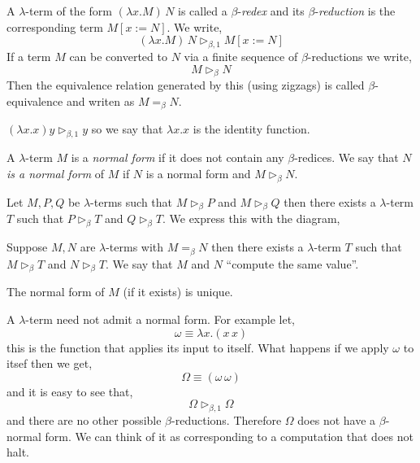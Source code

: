\documentclass[12pt]{article}
\newcommand{\red}{\triangleright}
\newcommand{\bredo}{\red_{\beta,1}}
\newcommand{\bred}{\red_{\beta}}
\begin{document}
\begin{defn}
A $\lambda$-term of the form $(\lambda x.M) \, N$ is called a $\beta$-\textit{redex} and its $\beta$-\textit{reduction} is the corresponding term $M [x := N]$. We write,
\[ (\lambda x.M) \, N \bredo M [x := N] \]
If a term $M$ can be converted to $N$ via a finite sequence of $\beta$-reductions we write,
\[ M \bred N \]
Then the equivalence relation generated by this (using zigzags) is called $\beta$-equivalence and writen as $M =_\beta N$. 
\end{defn}

\begin{example}
$( \lambda x . x) y \bredo y$ so we say that $\lambda x . x$ is the identity function.
\end{example}

\begin{defn}
A $\lambda$-term $M$ is a \textit{normal form} if it does not contain any $\beta$-redices. We say that $N$ \textit{is a normal form} of $M$ if $N$ is a normal form and $M \bred N$.
\end{defn} 

\begin{theorem}
Let $M, P, Q$ be $\lambda$-terms such that $M \bred P$ and $M \bred Q$ then there exists a $\lambda$-term $T$ such that $P \bred T$ and $Q \bred T$. We express this with the diagram,
\begin{center}
\end{center}
\end{theorem} 

\begin{cor}
Suppose $M, N$ are $\lambda$-terms with $M =_\beta N$ then there exists a $\lambda$-term $T$ such that $M \bred T$ and $N \bred T$. We say that $M$ and $N$ ``compute the same value''.
\end{cor}

\begin{cor}
The normal form of $M$ (if it exists) is unique.
\end{cor}

\begin{example}
A $\lambda$-term need not admit a normal form. For example let,
\[ \omega \equiv \lambda x . (x \, x) \]
this is the function that applies its input to itself. What happens if we apply $\omega$ to itsef then we get,
\[ \Omega \equiv (\omega \, \omega) \]
and it is easy to see that,
\[ \Omega \bredo \Omega \]
and there are no other possible $\beta$-reductions. Therefore $\Omega$ does not have a $\beta$-normal form. We can think of it as corresponding to a computation that does not halt.
\end{example}
\end{document}
